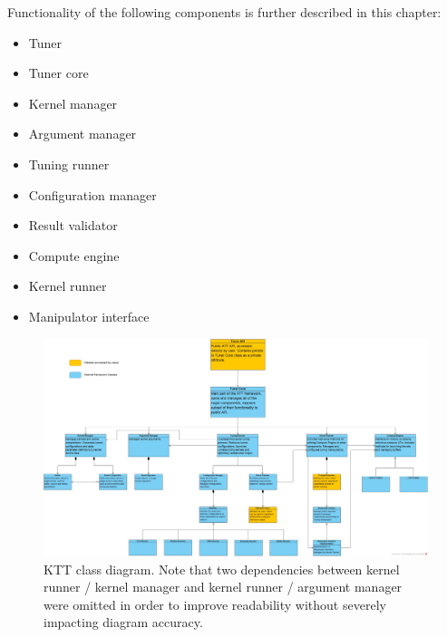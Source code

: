 \documentclass
[
    digital, %
    oneside, %
    table, %
    nolof, %
    nolot, %
    nocover %
]{fithesis3}
\begin{document}
Functionality of the following components is further described in this chapter:
\begin{itemize}
    \item Tuner
    \item Tuner core
    \item Kernel manager
    \item Argument manager
    \item Tuning runner
    \item Configuration manager
    \item Result validator
    \item Compute engine
    \item Kernel runner
    \item Manipulator interface
\end{itemize}

\clearpage
\thispagestyle{plain}
\begin{figure}
    \begin{adjustwidth}{-3.5cm}{-3.5cm}
        \includegraphics[width=250mm]{resources/ktt_class_diagram.jpg}  
    \end{adjustwidth}
    \caption{KTT class diagram. Note that two dependencies between kernel runner / kernel manager and kernel runner / argument manager were omitted
    in order to improve readability without severely impacting diagram accuracy.}
    \label{ktt-class-diagram}
\end{figure}
\clearpage
\end{document}
